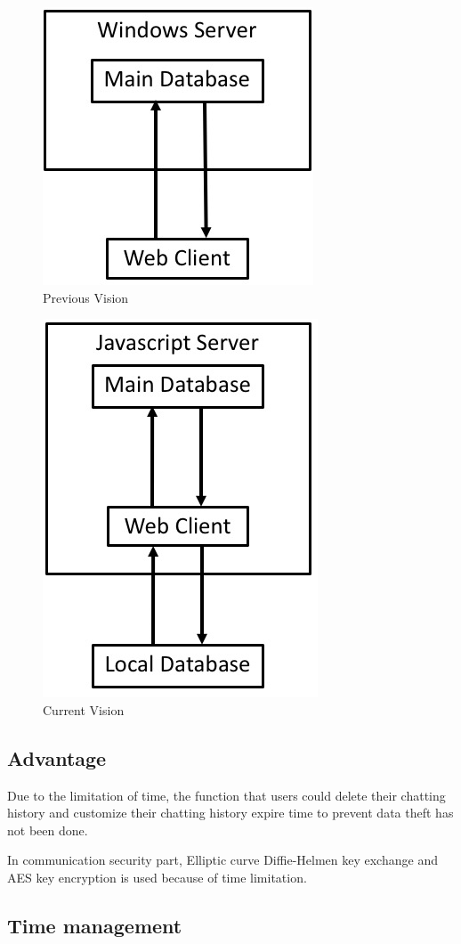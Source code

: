 \documentclass[a4paper,11pt]{article}
\begin{document}
\begin{figure}[!h]
\centering
\includegraphics[width = 0.5 \textwidth ]{previous_vision.jpeg}
\caption{\label{fig:UML}Previous Vision}
\end{figure}
\begin{figure}[!h]
\centering
\includegraphics[width = 0.5 \textwidth ]{current_vision.jpeg}
\caption{\label{fig:UML}Current Vision}
\end{figure}
\subsection{Advantage}
Due to the limitation of time, the function that users could delete their chatting history and customize their chatting history expire time to prevent data theft has not been done. 

In communication security part, Elliptic curve Diffie-Helmen key exchange and AES key encryption is used because of time limitation. 


\subsection{Time management}
\end{document}
